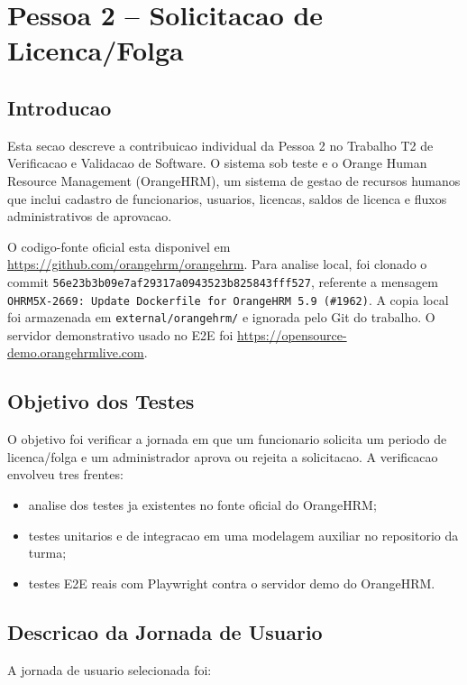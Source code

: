 \section{Pessoa 2 -- Solicitacao de Licenca/Folga}

\subsection{Introducao}
Esta secao descreve a contribuicao individual da Pessoa 2 no Trabalho T2 de Verificacao e Validacao de Software. O sistema sob teste e o Orange Human Resource Management (OrangeHRM), um sistema de gestao de recursos humanos que inclui cadastro de funcionarios, usuarios, licencas, saldos de licenca e fluxos administrativos de aprovacao.

O codigo-fonte oficial esta disponivel em \url{https://github.com/orangehrm/orangehrm}. Para analise local, foi clonado o commit \texttt{56e23b3b09e7af29317a0943523b825843fff527}, referente a mensagem \texttt{OHRM5X-2669: Update Dockerfile for OrangeHRM 5.9 (\#1962)}. A copia local foi armazenada em \texttt{external/orangehrm/} e ignorada pelo Git do trabalho. O servidor demonstrativo usado no E2E foi \url{https://opensource-demo.orangehrmlive.com}.

\subsection{Objetivo dos Testes}
O objetivo foi verificar a jornada em que um funcionario solicita um periodo de licenca/folga e um administrador aprova ou rejeita a solicitacao. A verificacao envolveu tres frentes:

\begin{itemize}
    \item analise dos testes ja existentes no fonte oficial do OrangeHRM;
    \item testes unitarios e de integracao em uma modelagem auxiliar no repositorio da turma;
    \item testes E2E reais com Playwright contra o servidor demo do OrangeHRM.
\end{itemize}

\subsection{Descricao da Jornada de Usuario}
A jornada de usuario selecionada foi:

